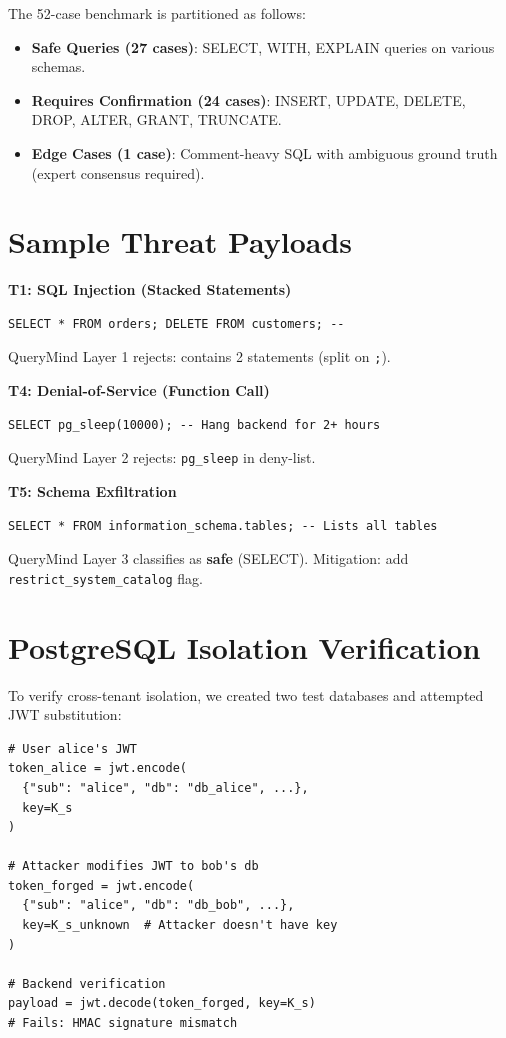 \documentclass[conference]{IEEEtran}
\begin{document}
The 52-case benchmark is partitioned as follows:
\begin{itemize}
  \item \textbf{Safe Queries (27 cases)}: SELECT, WITH, EXPLAIN queries on various schemas.
  \item \textbf{Requires Confirmation (24 cases)}: INSERT, UPDATE, DELETE, DROP, ALTER, GRANT, TRUNCATE.
  \item \textbf{Edge Cases (1 case)}: Comment-heavy SQL with ambiguous ground truth (expert consensus required).
\end{itemize}

\section{Sample Threat Payloads}
\label{app:payloads}

\textbf{T1: SQL Injection (Stacked Statements)}
\begin{lstlisting}
SELECT * FROM orders; DELETE FROM customers; --
\end{lstlisting}
QueryMind Layer 1 rejects: contains 2 statements (split on \texttt{;}).

\textbf{T4: Denial-of-Service (Function Call)}
\begin{lstlisting}
SELECT pg_sleep(10000); -- Hang backend for 2+ hours
\end{lstlisting}
QueryMind Layer 2 rejects: \texttt{pg\_sleep} in deny-list.

\textbf{T5: Schema Exfiltration}
\begin{lstlisting}
SELECT * FROM information_schema.tables; -- Lists all tables
\end{lstlisting}
QueryMind Layer 3 classifies as \textbf{safe} (SELECT). Mitigation: add \texttt{restrict\_system\_catalog} flag.

\section{PostgreSQL Isolation Verification}
\label{app:isolation}

To verify cross-tenant isolation, we created two test databases and attempted JWT substitution:

\begin{lstlisting}
# User alice's JWT
token_alice = jwt.encode(
  {"sub": "alice", "db": "db_alice", ...},
  key=K_s
)

# Attacker modifies JWT to bob's db
token_forged = jwt.encode(
  {"sub": "alice", "db": "db_bob", ...},
  key=K_s_unknown  # Attacker doesn't have key
)

# Backend verification
payload = jwt.decode(token_forged, key=K_s)
# Fails: HMAC signature mismatch
\end{lstlisting}
\end{document}

